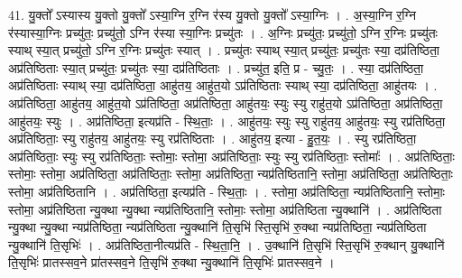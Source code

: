 \documentclass[17pt]{extarticle}
\begin{document}
41. यु॒क्तो᳚ ऽस्यास्य यु॒क्तो यु॒क्तो᳚ ऽस्या॒ग्नि र॒ग्नि र॑स्य यु॒क्तो यु॒क्तो᳚ ऽस्या॒ग्निः । . अ॒स्या॒ग्नि र॒ग्नि र॑स्यास्या॒ग्निः प्रच्यु॑तः॒ प्रच्यु॑तो॒ ऽग्नि र॑स्या स्या॒ग्निः प्रच्यु॑तः । . अ॒ग्निः प्रच्यु॑तः॒ प्रच्यु॑तो॒ ऽग्नि र॒ग्निः प्रच्यु॑तः स्याथ् स्या॒त् प्रच्यु॑तो॒ ऽग्नि र॒ग्निः प्रच्यु॑तः स्यात् । . प्रच्यु॑तः स्याथ् स्या॒त् प्रच्यु॑तः॒ प्रच्यु॑तः स्या॒ दप्र॑तिष्ठिता॒ अप्र॑तिष्ठिताः स्या॒त् प्रच्यु॑तः॒ प्रच्यु॑तः स्या॒ दप्र॑तिष्ठिताः । . प्रच्यु॑त॒ इति॒ प्र - च्यु॒तः॒ । . स्या॒ दप्र॑तिष्ठिता॒ अप्र॑तिष्ठिताः स्याथ् स्या॒ दप्र॑तिष्ठिता॒ आहु॑तय॒ आहु॑त॒यो ऽप्र॑तिष्ठिताः स्याथ् स्या॒ दप्र॑तिष्ठिता॒ आहु॑तयः । . अप्र॑तिष्ठिता॒ आहु॑तय॒ आहु॑त॒यो ऽप्र॑तिष्ठिता॒ अप्र॑तिष्ठिता॒ आहु॑तयः॒ स्युः स्यु राहु॑त॒यो ऽप्र॑तिष्ठिता॒ अप्र॑तिष्ठिता॒ आहु॑तयः॒ स्युः । . अप्र॑तिष्ठिता॒ इत्यप्र॑ति - स्थि॒ताः॒ । . आहु॑तयः॒ स्युः स्यु राहु॑तय॒ आहु॑तयः॒ स्यु रप्र॑तिष्ठिता॒ अप्र॑तिष्ठिताः॒ स्यु राहु॑तय॒ आहु॑तयः॒ स्यु रप्र॑तिष्ठिताः । . आहु॑तय॒ इत्या - हु॒त॒यः॒ । . स्यु रप्र॑तिष्ठिता॒ अप्र॑तिष्ठिताः॒ स्युः स्यु रप्र॑तिष्ठिताः॒ स्तोमाः॒ स्तोमा॒ अप्र॑तिष्ठिताः॒ स्युः स्यु रप्र॑तिष्ठिताः॒ स्तोमाः᳚ । . अप्र॑तिष्ठिताः॒ स्तोमाः॒ स्तोमा॒ अप्र॑तिष्ठिता॒ अप्र॑तिष्ठिताः॒ स्तोमा॒ अप्र॑तिष्ठिता॒ न्यप्र॑तिष्ठितानि॒ स्तोमा॒ अप्र॑तिष्ठिता॒ अप्र॑तिष्ठिताः॒ स्तोमा॒ अप्र॑तिष्ठितानि । . अप्र॑तिष्ठिता॒ इत्यप्र॑ति - स्थि॒ताः॒ । . स्तोमा॒ अप्र॑तिष्ठिता॒ न्यप्र॑तिष्ठितानि॒ स्तोमाः॒ स्तोमा॒ अप्र॑तिष्ठिता न्यु॒क्था न्यु॒क्था न्यप्र॑तिष्ठितानि॒ स्तोमाः॒ स्तोमा॒ अप्र॑तिष्ठिता न्यु॒क्थानि॑ । . अप्र॑तिष्ठिता न्यु॒क्था न्यु॒क्था न्यप्र॑तिष्ठिता॒ न्यप्र॑तिष्ठिता न्यु॒क्थानि॑ ति॒सृभि॑ स्ति॒सृभि॑ रु॒क्था न्यप्र॑तिष्ठिता॒ न्यप्र॑तिष्ठिता न्यु॒क्थानि॑ ति॒सृभिः॑ । . अप्र॑तिष्ठिता॒नीत्यप्र॑ति - स्थि॒ता॒नि॒ । . उ॒क्थानि॑ ति॒सृभि॑ स्ति॒सृभि॑ रु॒क्थान् यु॒क्थानि॑ ति॒सृभिः॑ प्रातस्सव॒ने प्रा॑तस्सव॒ने ति॒सृभि॑ रु॒क्था न्यु॒क्थानि॑ ति॒सृभिः॑ प्रातस्सव॒ने । \newline
\end{document}
